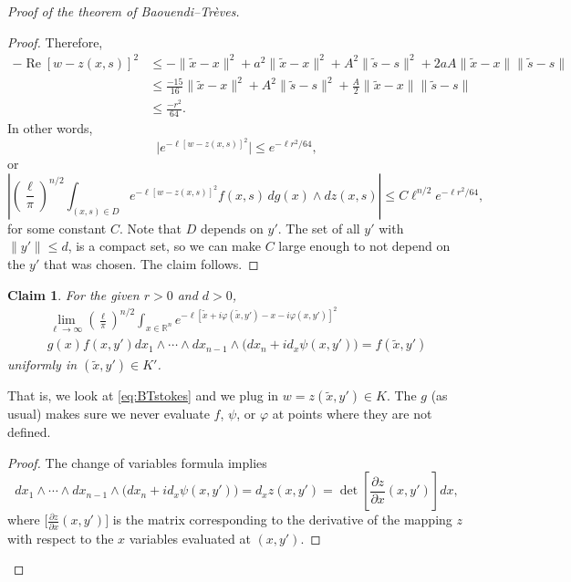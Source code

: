 \documentclass[12pt,openany]{book}
\renewcommand{\Re}{\operatorname{Re}}
\newcommand{\snorm}[1]{\lVert {#1} \rVert}
\newcommand{\babs}[1]{\bigl\lvert {#1} \bigr\rvert}
\newcommand{\abs}[1]{\left\lvert {#1} \right\rvert}
\newcommand{\R}{{\mathbb{R}}}
\theoremstyle{plain}
\newtheorem{claim}[thm]{Claim}
\theoremstyle{remark}
\theoremstyle{definition}
\theoremstyle{exercise}
\theoremstyle{example}
\begin{document}
\begin{proof}[Proof of the theorem of Baouendi--Tr{\`e}ves]
\begin{proof}
Therefore,
\begin{equation*}
\begin{split}
-\Re {[w - z(x,s)]}^2 & \leq
- \snorm{\tilde{x}-x}^2
+
a^2 \snorm{\tilde{x}-x}^2
+
A^2 \snorm{\tilde{s}-s}^2
+
2aA \snorm{\tilde{x}-x}\snorm{\tilde{s}-s}
\\
& \leq
\frac{-15}{16} \snorm{\tilde{x}-x}^2
+
A^2 \snorm{\tilde{s}-s}^2
+
\frac{A}{2} \snorm{\tilde{x}-x}\snorm{\tilde{s}-s}
\\
& \leq \frac{-r^2}{64} .
\end{split}
\end{equation*}
In other words,
\begin{equation*}
\babs{
e^{-\ell[w-z(x,s)]^2}}
\leq
e^{-\ell r^2  / 64} ,
\end{equation*}
or
\begin{equation*}
\abs{
{\left(\frac{\ell}{\pi}\right)}^{n/2}
\int_{(x,s)\in D}
e^{-\ell [w - z(x,s)]^2} f(x,s)
\,
dg(x)
\wedge
dz(x,s)
}
\leq
C
\ell^{n/2}
e^{-\ell r^2  / 64} ,
\end{equation*}
for some constant $C$.  Note that $D$ depends on $y'$.  The set of
all $y'$ with $\snorm{y'} \leq d$,
is a compact set, so we can make $C$
large enough to not depend on the $y'$ that was chosen.
The claim follows.
\end{proof}

\begin{claim}
For the given $r>0$ and $d>0$,
\begin{multline*}
\lim_{\ell\to\infty}
{\left(\frac{\ell}{\pi}\right)}^{n/2}
\int_{x \in \R^n}
e^{  -\ell [\tilde{x}+i\varphi(\tilde{x},y') - x-i\varphi(x,y')]^2 }
\\
g(x) f(x,y')
dx_1  \wedge
\cdots \wedge
dx_{n-1}
\wedge
\bigl(dx_{n} + i d_x \psi (x,y') \bigr)
= f(\tilde{x},y')
\end{multline*}
uniformly in $(\tilde{x},y') \in K'$.
\end{claim}

That is, we look at \eqref{eq:BTstokes} and we plug in $w = z(\tilde{x},y') \in K$.
The $g$ (as usual) makes sure we never evaluate $f$, $\psi$, or
$\varphi$ at
points where they are not defined.

\begin{proof}
The change of variables formula implies
\begin{equation*}
dx_1  \wedge
\cdots \wedge
dx_{n-1}
\wedge
\bigl(dx_{n} + i d_x \psi (x,y') \bigr)
=
d_x z(x,y')
=
\det \left[\frac{\partial z}{\partial x}(x,y')\right] dx ,
\end{equation*}
where $\bigl[\frac{\partial z}{\partial x}(x,y')\bigr]$ is the matrix
corresponding to the derivative of the mapping $z$ with respect to the $x$
variables evaluated at $(x,y')$.


\end{proof}
\end{proof}
\end{document}
